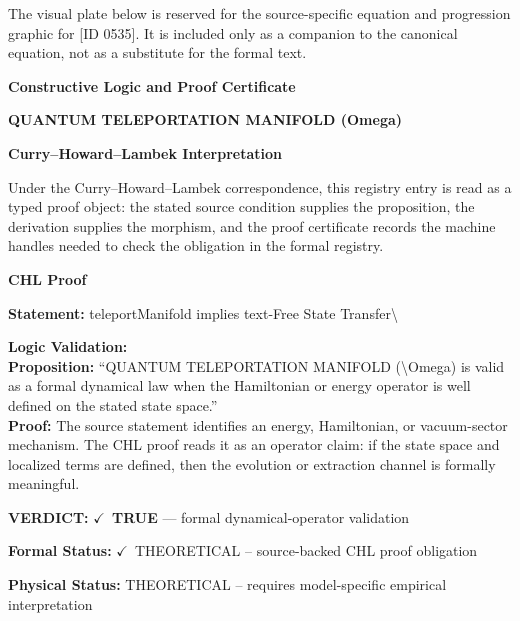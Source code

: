 \begingroup\footnotesize\sloppy
The visual plate below is reserved for the source-specific equation and progression graphic for [ID 0535]. It is included only as a companion to the canonical equation, not as a substitute for the formal text.
\par\endgroup
\ifTZPDarkEdition
{}
\fi

\clearpage
\begingroup\tzpsupportsetup
\noindent\textbf{\fontsize{10.8pt}{12.8pt}\selectfont [ID 0535] Constructive Logic and Proof Certificate}\par
\noindent\textbf{\fontsize{10pt}{12pt}\selectfont QUANTUM TELEPORTATION MANIFOLD (Omega)}\par
\vspace{0.45em}
\begingroup
\footnotesize
\setlength{\parskip}{0.22em}
\setlength{\parindent}{0pt}
\noindent\textbf{Curry--Howard--Lambek Interpretation}\par
Under the Curry--Howard--Lambek correspondence, this registry entry is read as a typed proof
object: the stated source condition supplies the proposition, the derivation supplies the
morphism, and the proof certificate records the machine handles needed to check the obligation
in the formal registry.

\vspace{0.45em}
\noindent\textbf{CHL Proof}\par
\textbf{Statement:} teleportManifold implies text-Free State Transfer\textbackslash{}

\textbf{Logic Validation:}\\
\textbf{Proposition:} ``QUANTUM TELEPORTATION MANIFOLD (\textbackslash{}Omega) is valid as a formal dynamical law when the
Hamiltonian or energy operator is well defined on the stated state space.''\\
\textbf{Proof:} The source statement identifies an energy, Hamiltonian, or vacuum-sector mechanism. The
CHL proof reads it as an operator claim: if the state space and localized terms are
defined, then the evolution or extraction channel is formally meaningful.

\textbf{VERDICT:} \ensuremath{\checkmark}\ \textbf{TRUE} --- formal dynamical-operator validation

\textbf{Formal Status:} \ensuremath{\checkmark}\ THEORETICAL -- source-backed CHL proof obligation

\textbf{Physical Status:} THEORETICAL -- requires model-specific empirical interpretation
\par\vspace{0.45em}
\par
\ifTZPDarkEdition
{}
\fi
\endgroup
\endgroup
